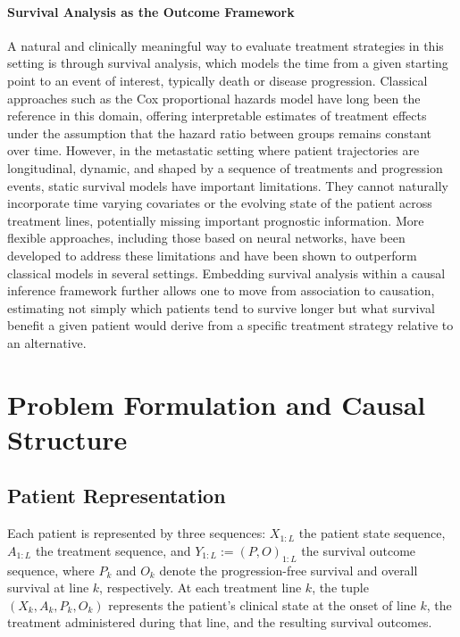 \documentclass[a4paper,10pt]{article}
\begin{document}
\paragraph{Survival Analysis as the Outcome Framework}
A natural and clinically meaningful way to evaluate treatment strategies in this setting is through survival analysis, which models the time from a given starting point to an event of interest, typically death or disease progression. Classical approaches such as the Cox proportional hazards model have long been the reference in this domain, offering interpretable estimates of treatment effects under the assumption that the hazard ratio between groups remains constant over time. However, in the metastatic setting where patient trajectories are longitudinal, dynamic, and shaped by a sequence of treatments and progression events, static survival models have important limitations. They cannot naturally incorporate time varying covariates or the evolving state of the patient across treatment lines, potentially missing important prognostic information. More flexible approaches, including those based on neural networks, have been developed to address these limitations and have been shown to outperform classical models in several settings. Embedding survival analysis within a causal inference framework further allows one to move from association to causation, estimating not simply which patients tend to survive longer but what survival benefit a given patient would derive from a specific treatment strategy relative to an alternative.

\section{Problem Formulation and Causal Structure}

\subsection{Patient Representation}

Each patient is represented by three sequences: $X_{1:L}$ the patient state sequence, $A_{1:L}$ the treatment sequence, and $Y_{1:L} := (P, O)_{1:L}$ the survival outcome sequence, where $P_k$ and $O_k$ denote the progression-free survival and overall survival at line $k$, respectively. At each treatment line $k$, the tuple $(X_k, A_k, P_k, O_k)$ represents the patient's clinical state at the onset of line $k$, the treatment administered during that line, and the resulting survival outcomes.
\end{document}
